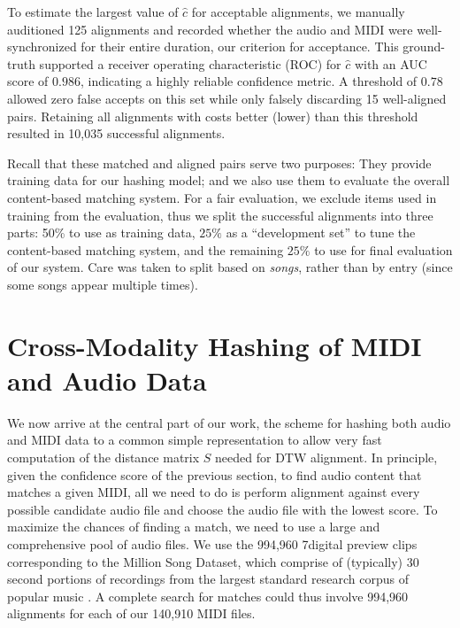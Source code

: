 \documentclass{article}
\begin{document}
To estimate the largest value of $\hat{c}$ for acceptable alignments, we manually auditioned 125 alignments and recorded whether the audio and MIDI were well-synchronized for their entire duration, our criterion for acceptance.
This ground-truth supported a receiver operating characteristic (ROC) for $\hat{c}$ with an AUC score of $0.986$, indicating a highly reliable confidence metric.
A threshold of $0.78$ allowed zero false accepts on this set while only falsely discarding 15 well-aligned pairs.
Retaining all alignments with costs better (lower) than this threshold resulted in 10,035 successful alignments.

Recall that these matched and aligned pairs serve two purposes: They provide training data for our hashing model; and we also use them to evaluate the overall content-based matching system.
For a fair evaluation, we exclude items used in training from the evaluation, thus we split the successful alignments into three parts: 50\% to use as training data, $25\%$ as a ``development set'' to tune the content-based matching system, and the remaining $25\%$ to use for final evaluation of our system.
Care was taken to split based on \textit{songs}, rather than by entry (since some songs appear multiple times).

\section{Cross-Modality Hashing of MIDI and Audio Data}
\label{sec:hashing}

We now arrive at the central part of our work, the scheme for hashing both audio and MIDI data to a  common simple representation to allow very fast computation of the distance matrix $S$ needed for DTW alignment.
In principle, given the confidence score of the previous section, to find audio content that matches a given MIDI, all we need to do is perform alignment against every possible candidate audio file and choose the audio file with the lowest score.
To maximize the chances of finding a match, we need to use a large and comprehensive pool of audio files.
We use the 994,960 7digital preview clips corresponding to the Million Song Dataset, which comprise of (typically) 30 second portions of recordings from the largest standard research corpus of popular music \cite{schindler2012facilitating}.
A complete search for matches could thus involve 994,960 alignments for each of our 140,910 MIDI files.
\end{document}
